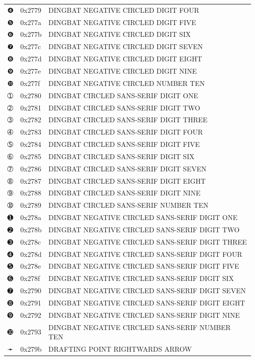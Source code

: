 \documentclass[12pt, twoside]{article}
\begin{document}
\begin{longtable}{L{1.0cm} L{2.0cm} >{\footnotesize}L{10cm}}
$❹$&0x2779&DINGBAT NEGATIVE CIRCLED DIGIT FOUR\\
$❺$&0x277a&DINGBAT NEGATIVE CIRCLED DIGIT FIVE\\
$❻$&0x277b&DINGBAT NEGATIVE CIRCLED DIGIT SIX\\
$❼$&0x277c&DINGBAT NEGATIVE CIRCLED DIGIT SEVEN\\
$❽$&0x277d&DINGBAT NEGATIVE CIRCLED DIGIT EIGHT\\
$❾$&0x277e&DINGBAT NEGATIVE CIRCLED DIGIT NINE\\
$❿$&0x277f&DINGBAT NEGATIVE CIRCLED NUMBER TEN\\
$➀$&0x2780&DINGBAT CIRCLED SANS-SERIF DIGIT ONE\\
$➁$&0x2781&DINGBAT CIRCLED SANS-SERIF DIGIT TWO\\
$➂$&0x2782&DINGBAT CIRCLED SANS-SERIF DIGIT THREE\\
$➃$&0x2783&DINGBAT CIRCLED SANS-SERIF DIGIT FOUR\\
$➄$&0x2784&DINGBAT CIRCLED SANS-SERIF DIGIT FIVE\\
$➅$&0x2785&DINGBAT CIRCLED SANS-SERIF DIGIT SIX\\
$➆$&0x2786&DINGBAT CIRCLED SANS-SERIF DIGIT SEVEN\\
$➇$&0x2787&DINGBAT CIRCLED SANS-SERIF DIGIT EIGHT\\
$➈$&0x2788&DINGBAT CIRCLED SANS-SERIF DIGIT NINE\\
$➉$&0x2789&DINGBAT CIRCLED SANS-SERIF NUMBER TEN\\
$➊$&0x278a&DINGBAT NEGATIVE CIRCLED SANS-SERIF DIGIT ONE\\
$➋$&0x278b&DINGBAT NEGATIVE CIRCLED SANS-SERIF DIGIT TWO\\
$➌$&0x278c&DINGBAT NEGATIVE CIRCLED SANS-SERIF DIGIT THREE\\
$➍$&0x278d&DINGBAT NEGATIVE CIRCLED SANS-SERIF DIGIT FOUR\\
$➎$&0x278e&DINGBAT NEGATIVE CIRCLED SANS-SERIF DIGIT FIVE\\
$➏$&0x278f&DINGBAT NEGATIVE CIRCLED SANS-SERIF DIGIT SIX\\
$➐$&0x2790&DINGBAT NEGATIVE CIRCLED SANS-SERIF DIGIT SEVEN\\
$➑$&0x2791&DINGBAT NEGATIVE CIRCLED SANS-SERIF DIGIT EIGHT\\
$➒$&0x2792&DINGBAT NEGATIVE CIRCLED SANS-SERIF DIGIT NINE\\
$➓$&0x2793&DINGBAT NEGATIVE CIRCLED SANS-SERIF NUMBER TEN\\
$➛$&0x279b&DRAFTING POINT RIGHTWARDS ARROW\\

\end{longtable}
\end{document}
